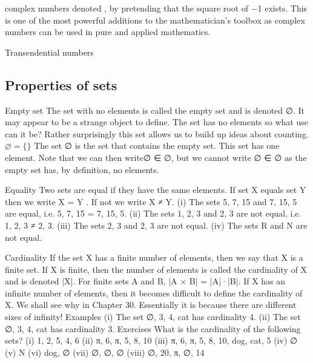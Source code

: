 complex numbers
denoted , by pretending that the square root of −1 exists. This is one of the most powerful additions to the mathematician’s toolbox as complex numbers can be used in pure and applied mathematics.

Transendential numbers

\subsection{Properties of sets}


Empty set
The set with no elements is called the empty set and is denoted ∅. It may appear to be a strange object to define. The set has no elements so what use can it be? Rather surprisingly this set allows us to build up ideas about counting.
$\varnothing = \{\}$
The set {∅} is the set that contains the empty set. This set has one element. Note that we can then write∅ ∈ {∅}, but we cannot write ∅ ∈ ∅ as the empty set has, by definition, no elements.

Equality
Two sets are equal if they have the same elements. If set X equals set Y then we write X = Y . If not we write X ≠ Y.
(i) The sets {5, 7, 15} and {7, 15, 5} are equal, i.e. {5, 7, 15} = {7, 15, 5}. 
(ii) The sets {1, 2, 3} and {2, 3} are not equal, i.e. {1, 2, 3} ≠ {2, 3}. 
(iii) The sets {2, 3} and {{2}, 3} are not equal. 
(iv) The sets R and N are not equal.

Cardinality
If the set X has a finite number of elements, then we say that X is a finite set. If X is finite, then the number of elements is called the cardinality of X and is denoted |X|. For finite sets A and B, |A × B| = |A|·|B|.
If X has an infinite number of elements, then it becomes difficult to define the cardinality of X. We shall see why in Chapter 30. Essentially it is because there are different sizes of infinity! 
Examples 
(i) The set {∅, 3, 4, cat} has cardinality 4. 
(ii) The set {∅, 3, {4, cat} } has cardinality 3.
Exercises 
What is the cardinality of the following sets? 
(i) {1, 2, 5, 4, 6} 
(ii) {π, 6, {π, 5, 8, 10}} 
(iii) {π, 6, {π, 5, 8, 10}, {dog, cat, {5}}}
(iv) ∅ 
(v) N 
(vi) {dog, ∅} 
(vii) {∅, {∅, {∅}}} 
(viii) {∅, {20, π, {∅}}, 14}

